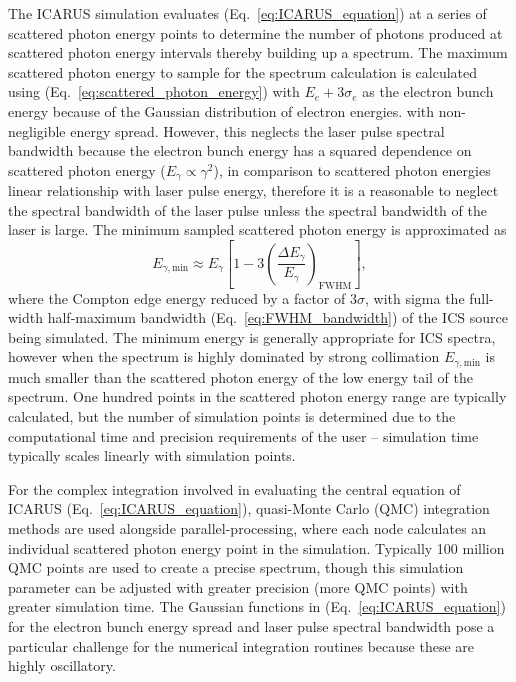 \documentclass[../main.tex]{subfiles}
\begin{document}
The \textsc{ICARUS} simulation evaluates (Eq.~\ref{eq:ICARUS_equation}) at a series of scattered photon energy points to determine the number of photons produced at scattered photon energy intervals thereby building up a spectrum. The maximum scattered photon energy to sample for the spectrum calculation is calculated using (Eq.~\ref{eq:scattered_photon_energy}) with $E_{e}+3\sigma_{e}$ as the electron bunch energy because of the Gaussian distribution of electron energies. with non-negligible energy spread. However, this neglects the laser pulse spectral bandwidth because the electron bunch energy has a squared dependence on scattered photon energy ($E_{\gamma}\propto\gamma^{2}$), in comparison to scattered photon energies linear relationship with laser pulse energy, therefore it is a reasonable to neglect the spectral bandwidth of the laser pulse unless the spectral bandwidth of the laser is large. The minimum sampled scattered photon energy is approximated as
\begin{equation}
E_{\gamma,\mathrm{min}} \approx E_{\gamma}\left[1-3\left(\frac{\Delta E_{\gamma}}{E_{\gamma}}\right)_{\mathrm{FWHM}}\right],
\label{eq:ICARUS_minimum_energy}
\end{equation}
where the Compton edge energy reduced by a factor of $3\sigma$, with sigma the full-width half-maximum bandwidth (Eq.~\ref{eq:FWHM_bandwidth}) of the ICS source being simulated. The minimum energy is generally appropriate for ICS spectra, however when the spectrum is highly dominated by strong collimation $E_{\gamma,\mathrm{min}}$ is much smaller than the scattered photon energy of the low energy tail of the spectrum. One hundred points in the scattered photon energy range are typically calculated, but the number of simulation points is determined due to the computational time and precision requirements of the user -- simulation time typically scales linearly with simulation points.  

For the complex integration involved in evaluating the central equation of \textsc{ICARUS} (Eq.~\ref{eq:ICARUS_equation}), quasi-Monte Carlo (QMC) integration methods are used alongside parallel-processing, where each node calculates an individual scattered photon energy point in the simulation. Typically 100 million QMC points are used to create a precise spectrum, though this simulation parameter can be adjusted with greater precision (more QMC points) with greater simulation time. The Gaussian functions in (Eq.~\ref{eq:ICARUS_equation}) for the electron bunch energy spread and laser pulse spectral bandwidth pose a particular challenge for the numerical integration routines because these are highly oscillatory. 
\end{document}
